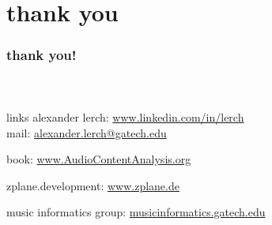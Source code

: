     \section[thanks]{thank you}

      \begin{frame}\frametitle{thank you!}\framesubtitle{~}
            \begin{block}{links}
                alexander lerch: \href{https://www.linkedin.com/in/lerch}{www.linkedin.com/in/lerch}\\             
                
								\bigskip
								mail: \href{mailto:alexander.lerch@gatech.edu}{alexander.lerch@gatech.edu}
                
                \bigskip                
                book: \href{https://www.AudioContentAnalysis.org}{www.AudioContentAnalysis.org}
                

                \bigskip
                zplane.development: 
                \href{https://www.zplane.de}{www.zplane.de}

								\bigskip
                music informatics group:
                \href{http://musicinformatics.gatech.edu}{musicinformatics.gatech.edu}
								
								\vspace{5mm}

            \end{block}
            
        \end{frame}
